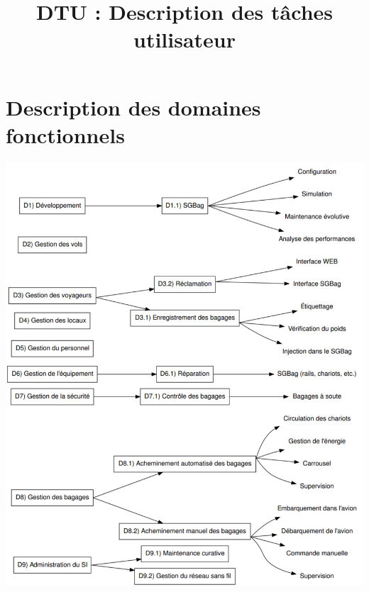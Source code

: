 

\title{DTU : Description des tâches utilisateur}


\maketitle
\tableofcontents
\newpage

\part{Description des domaines fonctionnels}
\includegraphics[width=\linewidth]{../../DDF/src/img/DDF.pdf}

